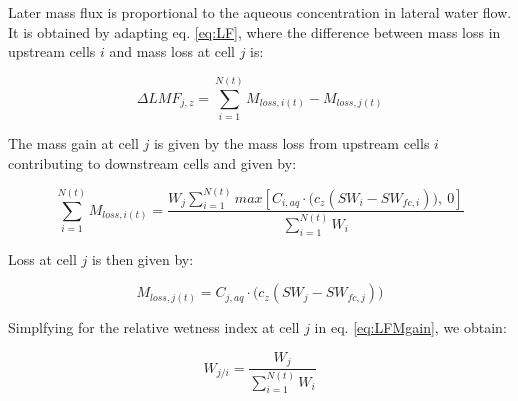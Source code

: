 \documentclass[]{article}
\begin{document}
Later mass flux is proportional to the aqueous concentration in lateral
water flow. It is obtained by adapting eq. \ref{eq:LF}, where the
difference between mass loss in upstream cells \(i\) and mass loss at
cell \(j\) is:

\begin{equation}
\Delta LMF_{j,z} = \sum^{N(t)}_{i=1} M_{loss, i(t)} - M_{loss,j(t)}
\label{eq:LMF}  
\end{equation}

The mass gain at cell \(j\) is given by the mass loss from upstream
cells \(i\) contributing to downstream cells and given by:

\begin{equation}
\sum^{N(t)}_{i=1} M_{loss, i(t)} = \frac{W_{j} \sum^{N(t)}_{i=1}max[ C_{i,aq}\cdot\Big(c_{z}(SW_{i}-SW_{fc,i})\Big),~0] }{ \sum^{N(t)}_{i=1} W_{i} }
\label{eq:LFMgain} 
\end{equation}

Loss at cell \(j\) is then given by:

\begin{equation}
M_{loss,j(t)} = C_{j,aq}\cdot\Big(c_{z}(SW_{j}-SW_{fc,j})\Big)
\end{equation}

Simplfying for the relative wetness index at cell \(j\) in eq.
\ref{eq:LFMgain}, we obtain:

\begin{equation}
W_{j/i} = \frac{W_{j}}{\sum^{N(t)}_{i=1} W_{i} } 
\end{equation}
\end{document}

